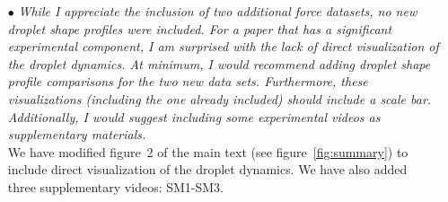 \documentclass[]{article}
\begin{document}
\begin{enumerate}
	\item[$\bullet$] \textit{While I appreciate the inclusion of two additional force datasets, no new droplet shape profiles were included. For a paper that has a significant experimental component, I am surprised with the lack of direct visualization of the droplet dynamics. At minimum, I would recommend adding droplet shape profile comparisons for the two new data sets. Furthermore, these visualizations (including the one already included) should include a scale bar. Additionally, I would suggest including some experimental videos as supplementary materials.}\\[2mm]
	
	We have modified figure~2 of the main text (see figure~\ref{fig:summary}) to include direct visualization of the droplet dynamics. We have also added three supplementary videos: SM1-SM3. 
	

\end{enumerate}
\end{document}
